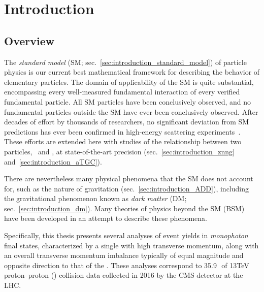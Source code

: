 \chapter{Introduction} \label{chap:introduction}
\section{Overview} \label{sec:introduction_overview}
The \textit{standard model} (SM; sec.~\ref{sec:introduction_standard_model}) of particle physics is our current best mathematical framework for describing the behavior
of elementary particles. The domain of applicability of the SM is quite substantial, encompassing
every well-measured fundamental interaction of every verified fundamental particle. All SM particles have been conclusively observed,
and no fundamental particles outside the SM have ever been conclusively observed. After decades of effort by thousands of researchers,
no significant deviation from SM predictions has ever been confirmed in high-energy scattering experiments~\cite{ref:CahnGoldhaber, ref:PDG}.
These efforts are extended here with studies of the relationship between two particles, \PZ\ and \Pgamma, at state-of-the-art precision
(sec.~\ref{sec:introduction_znng} and~\ref{sec:introduction_aTGC}).

There are nevertheless many physical phenomena that the SM does not account for, such as the nature of gravitation (sec.~\ref{sec:introduction_ADD}),
including the gravitational phenomenon known as \textit{dark matter} (DM; sec.~\ref{sec:introduction_dm}). Many theories of physics beyond the SM (BSM)
have been developed in an attempt to describe these phenomena.

Specifically, this thesis presents several analyses of event yields in \textit{monophoton} final states, characterized by a single \Pgamma
with high transverse momentum, along with an overall transverse momentum imbalance typically of equal magnitude and opposite direction to
that of the \Pgamma. These analyses correspond to 35.9\,\fbinv\ of 13\unit{TeV} proton--proton (\Pp\Pp) collision data collected in 2016 by the CMS
detector at the LHC.

